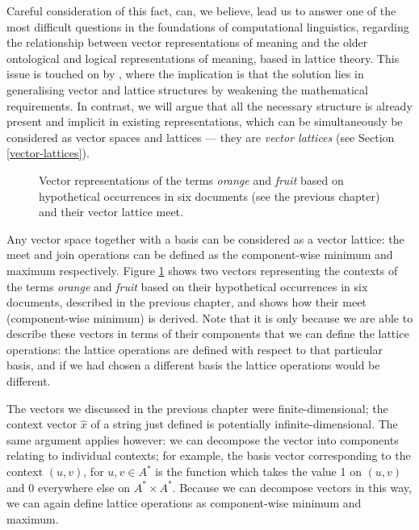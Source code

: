 Careful consideration of this fact, can, we believe, lead us to answer one of the most difficult questions in the foundations of computational linguistics, regarding the relationship between vector representations of meaning and the older ontological and logical representations of meaning, based in lattice theory. This issue is touched on by \cite{Widdows:04}, where the implication is that the solution lies in generalising vector and lattice structures by weakening the mathematical requirements. In contrast, we will argue that all the necessary structure is already present and implicit in existing representations, which can be simultaneously be considered as vector spaces and lattices --- they are \emph{vector lattices} (see Section \ref{vector-lattices}).

\begin{figure}
\begin{center}

\caption{Vector representations of the terms \emph{orange} and \emph{fruit} based on hypothetical occurrences in six documents (see the previous chapter) and their vector lattice meet.}
\label{orangefruit}
\end{center}
\end{figure}

Any vector space together with a basis can be considered as a vector lattice: the meet and join operations can be defined as the component-wise minimum and maximum respectively. Figure \ref{orangefruit} shows two vectors representing the contexts of the terms \emph{orange} and \emph{fruit} based on their hypothetical occurrences in six documents, described in the previous chapter, and shows how their meet (component-wise minimum) is derived. Note that it is only because we are able to describe these vectors in terms of their components that we can define the lattice operations: the lattice operations are defined with respect to that particular basis, and if we had chosen a different basis the lattice operations would be different.

The vectors we discussed in the previous chapter were finite-dimensional; the context vector $\hat{x}$ of a string just defined is potentially infinite-dimensional. The same argument applies however: we can decompose the vector into components relating to individual contexts; for example, the basis vector corresponding to the context $(u,v)$, for $u,v \in A^*$ is the function which takes the value 1 on $(u,v)$ and 0 everywhere else on $A^*\times A^*$. Because we can decompose vectors in this way, we can again define lattice operations as component-wise minimum and maximum.

